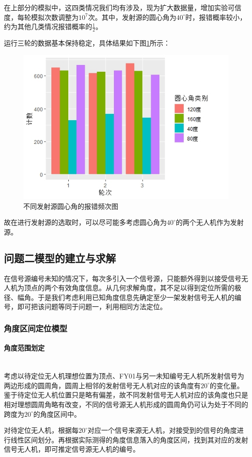\documentclass{ctexart}
\newcommand{\subsubsubsection}[1]{\paragraph{#1}\mbox{}\\}
\begin{document}
在上部分的模拟中，这四类情况我们均有涉及，现为扩大数据量，增加实验可信度，每轮模拟次数调整为$10^7$次。其中，发射源的圆心角为$40^{\circ}$时，报错概率较小，约为其他几类情况报错概率的$\frac{1}{2}$。

运行三轮的数据基本保持稳定，具体结果如下图\ref{不同发射源圆心角的报错频次图}所示：

\begin{figure}[H]
  \centering
  \includegraphics[width=0.55\linewidth]{pic/Rplot01.jpeg}
  \caption{不同发射源圆心角的报错频次图}
  \label{不同发射源圆心角的报错频次图}
  \end{figure}



故在进行发射源的选取时，可以尽可能多考虑圆心角为$40^{\circ}$的两个无人机作为发射源。


\subsection{问题二模型的建立与求解}

在信号源编号未知的情况下，每次多引入一个信号源，只能额外得到以接受信号无人机为顶点的两个有效角度信息。从几何求解角度，其不足以得到定位所需的极径、幅角。于是我们考虑利用已知角度信息先确定至少一架发射信号无人机的编号，即可把该问题等同于问题一，利用相同方法定位。

\subsubsection{角度区间定位模型}

\subsubsubsection{角度范围划定}

考虑以待定位无人机理想位置为顶点、FY01与另一未知编号无人机所发射信号为两边形成的圆周角，圆周上相邻的发射信号无人机对应的该角度有$20^{\circ}$的变化量。鉴于待定位无人机位置只是略有偏差，故不同发射信号无人机对应的该角度也只是相对理想圆周角略有改变，不同的信号源无人机形成的圆周角仍可认为处于不同的跨度为$20^{\circ}$的角度区间中。

对待定位无人机，根据每$20^{\circ}$对应一个信号来源无人机，对接受到的信号的角度进行线性区间划分。再根据实际测得的角度信息落入的角度区间，找到其对应的发射信号无人机，即可推定信号源无人机的编号。
\end{document}
